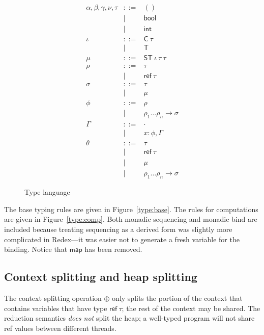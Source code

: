 \documentclass[twocolumn]{article}
\newcommand{\bnfdef}{::=}
\newcommand{\bnfalt}{\mathrel{\mid}}
\newcommand{\kw}[1]{\textsf{#1}}
\begin{document}
\begin{figure}
\begin{equation*}
\begin{array}{lcl}
  \alpha, \beta, \gamma, \nu, \tau
     & \bnfdef & () \\
     & \bnfalt & \kw{bool} \\
     & \bnfalt & \kw{int} \\
  \iota
     & \bnfdef & \kw{C}~ \tau \\
     & \bnfalt & \kw{T} \\
  \mu
     & \bnfdef & \kw{ST}~ \iota~ \tau~ \tau~ \\
  \rho
     & \bnfdef & \tau \\
     & \bnfalt & \kw{ref}~ \tau \\
  \sigma
     & \bnfdef & \tau \\
     & \bnfalt & \mu \\
  \phi
     & \bnfdef & \rho \\
     & \bnfalt & \rho_1 \ldots \rho_n \to \sigma \\
  \Gamma
     & \bnfdef & \cdot \\
     & \bnfalt & x : \phi, \Gamma \\
  \theta
     & \bnfdef & \tau \\
     & \bnfalt & \kw{ref}~ \tau \\
     & \bnfalt & \mu \\
     & \bnfalt & \rho_1 \ldots \rho_n \to \sigma
\end{array}
\end{equation*}
\caption{Type language}
\label{fig:lang:type}
\end{figure}

The base typing rules are given in Figure~\ref{type:base}. The rules for
computations are given in Figure~\ref{type:comp}. Both monadic sequencing and
monadic bind are included because treating sequencing as a derived form was
slightly more complicated in Redex---it was easier not to generate a fresh
variable for the binding. Notice that $\kw{map}$ has been removed.

\subsection{Context splitting and heap splitting}

The context splitting operation $\oplus$ only splits the portion of the context
that contains variables that have type $\kw{ref}~ \tau$; the rest of the context
may be shared. The reduction semantics \emph{does not} split the heap; a
well-typed program will not share \kw{ref} values between different threads.
\end{document}
